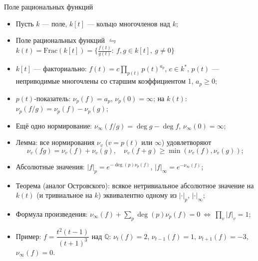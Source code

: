\documentclass[serif, aspectratio=169]{beamer}
\newcommand{\sagemark}{%
  \textcolor{green!40!black}{\textbf{\texttt{sage:...}}}%
}
\begin{document}
\begin{frame}{Поле рациональных функций}
    \begin{itemize}
        \item Пусть $k$ --- поле, $k[t]$ --- кольцо многочленов над $k$;
        \item Поле рациональных функций $\leftrightharpoons$ $k(t)=\mathrm{Frac}(k[t])=\{\frac{f(t)}{g(t)}:\ f,g\in k[t],\ g\neq0\}$
        \item $k[t]$ --- факториально: $f(t)=c\prod_{p(t)} p(t)^{a_p}$, $c\in k^*$, $p(t)$ --- неприводимые многочлены со старшим коэффициентом 1, $a_p\geqslant0$;
        \item $p(t)$-показатель: $\nu_p(f)=a_p$, $\nu_p(0)=\infty$; на $k(t)$: $\nu_p(f/g)=\nu_p(f)-\nu_p(g)$;
        \item Ещё одно нормирование: $\nu_\infty(f/g)=\deg g-\deg f$, $\nu_\infty(0)=\infty$;
        \item Лемма: все нормирования $\nu_v$ ($v=p(t)$ или $\infty$) удовлетворяют
        \[\nu_v(fg)=\nu_v(f)+\nu_v(g),\quad \nu_v(f+g)\geqslant\min(\nu_v(f),\nu_v(g));\]
        \item Абсолютные значения:
        $|f|_p=e^{-\deg(p)\nu_p(f)}$,
        $|f|_\infty=e^{-\nu_\infty(f)}$;
        \item Теорема (аналог Островского): всякое нетривиальное абсолютное значение на $k(t)$ (и тривиальное на $k$) эквивалентно одному из $|\cdot|_p$, $|\cdot|_\infty$;
        \item Формула произведения: $\nu_\infty(f)+\sum_p\deg(p)\nu_p(f)=0\ \Leftrightarrow\ \prod_v|f|_v=1$;
        \item Пример: $f=\dfrac{t^2(t-1)}{(t+1)^3}$ над $\mathbb{Q}$: $\nu_t(f)=2$, $\nu_{t-1}(f)=1$, $\nu_{t+1}(f)=-3$, $\nu_\infty(f)=0$.
    \end{itemize}

    \note{
        \begin{itemize}
            \item ---
        \end{itemize}
    }
\end{frame}
\end{document}
